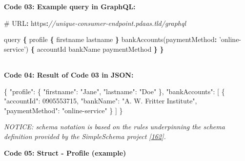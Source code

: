 \documentclass[12pt,english,a4paper,titlepage,cleardoublepage=empty,dottedtoc]{report}
\newenvironment{Shaded}{\begin{snugshade}}{\end{snugshade}}
\newcommand{\DataTypeTok}[1]{\textcolor[rgb]{0.13,0.29,0.53}{#1}}
\newcommand{\DecValTok}[1]{\textcolor[rgb]{0.00,0.00,0.81}{#1}}
\newcommand{\StringTok}[1]{\textcolor[rgb]{0.31,0.60,0.02}{#1}}
\newcommand{\CommentTok}[1]{\textcolor[rgb]{0.56,0.35,0.01}{\textit{#1}}}
\newcommand{\OtherTok}[1]{\textcolor[rgb]{0.56,0.35,0.01}{#1}}
\newcommand{\FunctionTok}[1]{\textcolor[rgb]{0.00,0.00,0.00}{#1}}
\newcommand{\OperatorTok}[1]{\textcolor[rgb]{0.81,0.36,0.00}{\textbf{#1}}}
\newcommand{\AttributeTok}[1]{\textcolor[rgb]{0.77,0.63,0.00}{#1}}
\newcommand{\NormalTok}[1]{#1}
\begin{document}
\newpage

\textbf{\protect\hypertarget{code-03_graphql-query}{}{Code 03: Example
query in GraphQL}:}

\begin{Shaded}
\begin{Highlighting}[numbers=left,,]
\NormalTok{# URL}\OperatorTok{:}\NormalTok{ https}\OperatorTok{:}\CommentTok{//unique-consumer-endpoint.pdaas.tld/graphql}

\NormalTok{query }\OperatorTok{\{}
\NormalTok{    profile }\OperatorTok{\{}
\NormalTok{        firstname}
\NormalTok{        lastname}
    \OperatorTok{\}}
    \AttributeTok{bankAccounts}\NormalTok{(}\DataTypeTok{paymentMethod}\OperatorTok{:} \StringTok{'online-service'}\NormalTok{) }\OperatorTok{\{}
\NormalTok{        accountId}
\NormalTok{        bankName}
\NormalTok{        paymentMethod}
    \OperatorTok{\}}
\OperatorTok{\}}
\end{Highlighting}
\end{Shaded}

~\\
\textbf{\protect\hypertarget{code-04_graphql-query-result}{}{Code 04:
Result of Code 03 in JSON}:}

\begin{Shaded}
\begin{Highlighting}[numbers=left,,]
\FunctionTok{\{}
    \DataTypeTok{"profile"}\FunctionTok{:} \FunctionTok{\{}
        \DataTypeTok{"firstname"}\FunctionTok{:} \StringTok{"Jane"}\FunctionTok{,} 
        \DataTypeTok{"lastname"}\FunctionTok{:} \StringTok{"Doe"}
    \FunctionTok{\},}
    \DataTypeTok{"bankAccounts"}\FunctionTok{:} \OtherTok{[}
        \FunctionTok{\{}
            \DataTypeTok{"accountId"}\FunctionTok{:} \DecValTok{0905553715}\FunctionTok{,}
            \DataTypeTok{"bankName"}\FunctionTok{:} \StringTok{"A. W. Fritter Institute"}\FunctionTok{,}
            \DataTypeTok{"paymentMethod"}\FunctionTok{:} \StringTok{"online-service"}
        \FunctionTok{\}}
    \OtherTok{]}
\FunctionTok{\}}
\end{Highlighting}
\end{Shaded}

\newpage

\emph{NOTICE: schema notation is based on the rules underpinning the
schema definition provided by the SimpleSchema project
{[}\protect\hyperlink{ref-web_2017_repo_node-simple-schema}{162}{]}.}

\textbf{\protect\hypertarget{code-05_struct_profile}{}{Code 05: Struct -
Profile (example)}}
\end{document}
